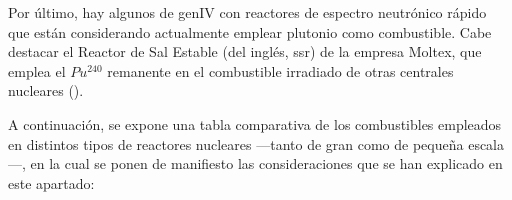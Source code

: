Por último, hay algunos  de \acrshort{genIV} con reactores de espectro neutrónico rápido que están considerando actualmente emplear plutonio como combustible. Cabe destacar el Reactor de Sal Estable (del inglés, \acrshort{ssr}) de la empresa Moltex, que emplea el $Pu^{240}$ remanente en el combustible irradiado de otras centrales nucleares (\cite{nea_smrs_2021}).

A continuación, se expone una tabla comparativa de los combustibles empleados en distintos tipos de reactores nucleares ---tanto de gran como de pequeña escala---, en la cual se ponen de manifiesto las consideraciones que se han explicado en este apartado:

\begin{table}[h]
  \centering
\end{table}

